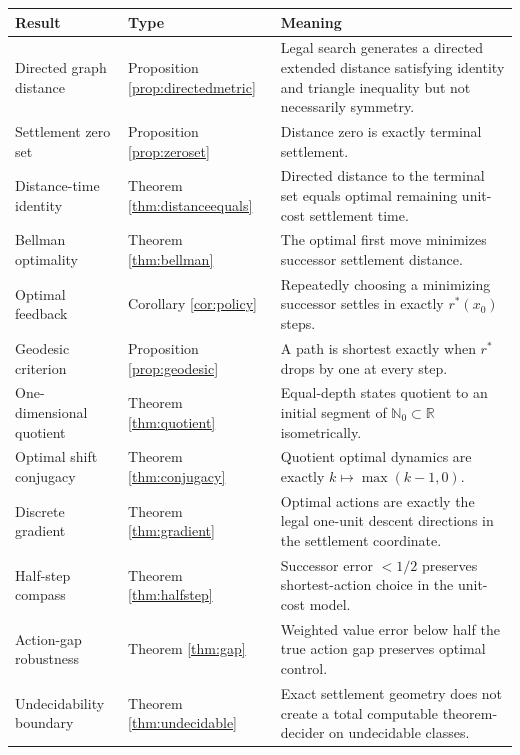 \documentclass[11pt,letterpaper]{article}
\theoremstyle{remark}
\newcommand{\N}{\mathbb N}
\newcommand{\R}{\mathbb R}
\newcommand{\rstar}{r^{\!*}}
\begin{document}
\begin{longtable}{p{}p{}p{}}
\toprule
\textbf{Result} & \textbf{Type} & \textbf{Meaning}\\
\midrule
\endhead
Directed graph distance & Proposition \ref{prop:directedmetric} & Legal search generates a directed extended distance satisfying identity and triangle inequality but not necessarily symmetry.\\
\addlinespace
Settlement zero set & Proposition \ref{prop:zeroset} & Distance zero is exactly terminal settlement.\\
\addlinespace
Distance-time identity & Theorem \ref{thm:distanceequals} & Directed distance to the terminal set equals optimal remaining unit-cost settlement time.\\
\addlinespace
Bellman optimality & Theorem \ref{thm:bellman} & The optimal first move minimizes successor settlement distance.\\
\addlinespace
Optimal feedback & Corollary \ref{cor:policy} & Repeatedly choosing a minimizing successor settles in exactly $\rstar(x_0)$ steps.\\
\addlinespace
Geodesic criterion & Proposition \ref{prop:geodesic} & A path is shortest exactly when $\rstar$ drops by one at every step.\\
\addlinespace
One-dimensional quotient & Theorem \ref{thm:quotient} & Equal-depth states quotient to an initial segment of $\N_0\subset\R$ isometrically.\\
\addlinespace
Optimal shift conjugacy & Theorem \ref{thm:conjugacy} & Quotient optimal dynamics are exactly $k\mapsto\max(k-1,0)$.\\
\addlinespace
Discrete gradient & Theorem \ref{thm:gradient} & Optimal actions are exactly the legal one-unit descent directions in the settlement coordinate.\\
\addlinespace
Half-step compass & Theorem \ref{thm:halfstep} & Successor error $<1/2$ preserves shortest-action choice in the unit-cost model.\\
\addlinespace
Action-gap robustness & Theorem \ref{thm:gap} & Weighted value error below half the true action gap preserves optimal control.\\
\addlinespace
Undecidability boundary & Theorem \ref{thm:undecidable} & Exact settlement geometry does not create a total computable theorem-decider on undecidable classes.\\
\bottomrule
\end{longtable}
\end{document}
